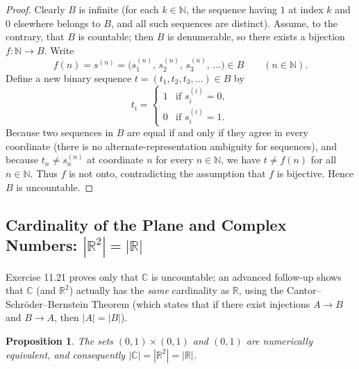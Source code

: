 \documentclass[11pt, letterpaper]{article}
\newtheorem{proposition}[theorem]{Proposition}
\theoremstyle{definition}
\theoremstyle{remark}
\begin{document}
\begin{proof}
Clearly $B$ is infinite (for each $k \in \mathbb{N}$, the sequence having $1$ at index $k$ and $0$ elsewhere belongs to $B$, and all such sequences are distinct). Assume, to the contrary, that $B$ is countable; then $B$ is denumerable, so there exists a bijection $f : \mathbb{N} \to B$. Write
\[
f(n) = s^{(n)} = \big(s^{(n)}_1,\, s^{(n)}_2,\, s^{(n)}_3,\, \dots\big) \in B \qquad (n \in \mathbb{N}).
\]
Define a new binary sequence $t = (t_1, t_2, t_3, \dots) \in B$ by
\[
t_i = \begin{cases}
1 & \text{if } s^{(i)}_i = 0, \\
0 & \text{if } s^{(i)}_i = 1.
\end{cases}
\]
Because two sequences in $B$ are equal if and only if they agree in every coordinate (there is no alternate-representation ambiguity for sequences), and because $t_n \neq s^{(n)}_n$ at coordinate $n$ for every $n \in \mathbb{N}$, we have $t \neq f(n)$ for all $n \in \mathbb{N}$. Thus $f$ is not onto, contradicting the assumption that $f$ is bijective. Hence $B$ is uncountable.
\end{proof}

\subsection{Cardinality of the Plane and Complex Numbers: $|\mathbb{R}^2| = |\mathbb{R}|$}

Exercise 11.21 proves only that $\mathbb{C}$ is uncountable; an advanced follow-up shows that $\mathbb{C}$ (and $\mathbb{R}^2$) actually has the \emph{same} cardinality as $\mathbb{R}$, using the Cantor--Schr\"oder--Bernstein Theorem (which states that if there exist injections $A \to B$ and $B \to A$, then $|A| = |B|$).

\begin{proposition}
The sets $(0, 1) \times (0, 1)$ and $(0, 1)$ are numerically equivalent, and consequently $|\mathbb{C}| = |\mathbb{R}^2| = |\mathbb{R}|$.
\end{proposition}
\end{document}
